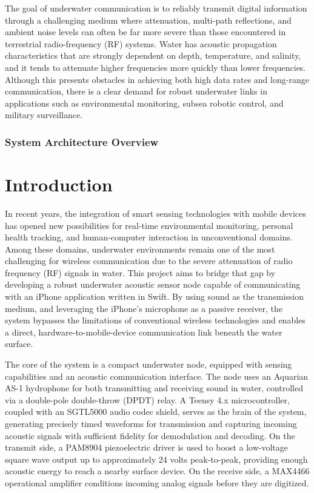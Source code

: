 The goal of underwater communication is to reliably transmit digital information through a challenging medium where attenuation, multi-path reflections, and ambient noise levels can often be far more severe than those encountered in terrestrial radio-frequency (RF) systems. Water has acoustic propagation characteristics that are strongly dependent on depth, temperature, and salinity, and it tends to attenuate higher frequencies more quickly than lower frequencies. Although this presents obstacles in achieving both high data rates and long-range communication, there is a clear demand for robust underwater links in applications such as environmental monitoring, subsea robotic control, and military surveillance.

\subsection{System Architecture Overview}

\chapter{Introduction}

In recent years, the integration of smart sensing technologies with mobile devices has opened new possibilities for real-time environmental monitoring, personal health tracking, and human-computer interaction in unconventional domains. Among these domains, underwater environments remain one of the most challenging for wireless communication due to the severe attenuation of radio frequency (RF) signals in water. This project aims to bridge that gap by developing a robust underwater acoustic sensor node capable of communicating with an iPhone application written in Swift. By using sound as the transmission medium, and leveraging the iPhone’s microphone as a passive receiver, the system bypasses the limitations of conventional wireless technologies and enables a direct, hardware-to-mobile-device communication link beneath the water surface.

The core of the system is a compact underwater node, equipped with sensing capabilities and an acoustic communication interface. The node uses an Aquarian AS-1 hydrophone for both transmitting and receiving sound in water, controlled via a double-pole double-throw (DPDT) relay. A Teensy 4.x microcontroller, coupled with an SGTL5000 audio codec shield, serves as the brain of the system, generating precisely timed waveforms for transmission and capturing incoming acoustic signals with sufficient fidelity for demodulation and decoding. On the transmit side, a PAM8904 piezoelectric driver is used to boost a low-voltage square wave output up to approximately 24 volts peak-to-peak, providing enough acoustic energy to reach a nearby surface device. On the receive side, a MAX4466 operational amplifier conditions incoming analog signals before they are digitized.

